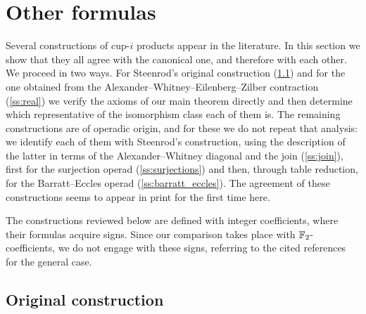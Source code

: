 
\section{Other formulas}\label{s:others}

Several constructions of \mbox{cup-$i$} products appear in the literature.
In this section we show that they all agree with the canonical one, and therefore with each other.
We proceed in two ways.
For Steenrod's original construction (\cref{ss:original}) and for the one obtained from the Alexander--Whitney--Eilenberg--Zilber contraction (\cref{ss:real}) we verify the axioms of our main theorem directly and then determine which representative of the isomorphism class each of them is.
The remaining constructions are of operadic origin, and for these we do not repeat that analysis: we identify each of them with Steenrod's construction, using the description of the latter in terms of the Alexander--Whitney diagonal and the join (\cref{ss:join}), first for the surjection operad (\cref{ss:surjections}) and then, through table reduction, for the Barratt--Eccles operad (\cref{ss:barratt_eccles}).
The agreement of these constructions seems to appear in print for the first time here.

The constructions reviewed below are defined with integer coefficients, where their formulas acquire signs.
Since our comparison takes place with ${\mathbb{F}_2}$-coefficients, we do not engage with these signs, referring to the cited references for the general case.

\subsection{Original construction}\label{ss:original}

